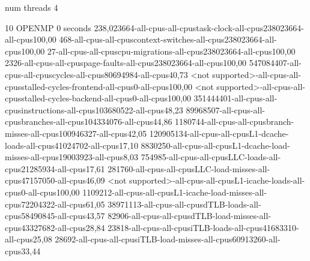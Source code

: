 num threads 4

10
OPENMP
0 seconds
238,023664-all-cpus-all-cpustask-clock-all-cpus238023664-all-cpus100,00
468-all-cpus-all-cpuscontext-switches-all-cpus238023664-all-cpus100,00
27-all-cpus-all-cpuscpu-migrations-all-cpus238023664-all-cpus100,00
2326-all-cpus-all-cpuspage-faults-all-cpus238023664-all-cpus100,00
547084407-all-cpus-all-cpuscycles-all-cpus80694984-all-cpus40,73
<not supported>-all-cpus-all-cpusstalled-cycles-frontend-all-cpus0-all-cpus100,00
<not supported>-all-cpus-all-cpusstalled-cycles-backend-all-cpus0-all-cpus100,00
351444401-all-cpus-all-cpusinstructions-all-cpus103680522-all-cpus48,23
89968507-all-cpus-all-cpusbranches-all-cpus104334076-all-cpus44,86
1180744-all-cpus-all-cpusbranch-misses-all-cpus100946327-all-cpus42,05
120905134-all-cpus-all-cpusL1-dcache-loads-all-cpus41024702-all-cpus17,10
8830250-all-cpus-all-cpusL1-dcache-load-misses-all-cpus19003923-all-cpus8,03
754985-all-cpus-all-cpusLLC-loads-all-cpus21285934-all-cpus17,61
281760-all-cpus-all-cpusLLC-load-misses-all-cpus47157050-all-cpus46,09
<not supported>-all-cpus-all-cpusL1-icache-loads-all-cpus0-all-cpus100,00
1109212-all-cpus-all-cpusL1-icache-load-misses-all-cpus72204322-all-cpus61,05
38971113-all-cpus-all-cpusdTLB-loads-all-cpus58490845-all-cpus43,57
82906-all-cpus-all-cpusdTLB-load-misses-all-cpus43327682-all-cpus28,84
23818-all-cpus-all-cpusiTLB-loads-all-cpus41683310-all-cpus25,08
28692-all-cpus-all-cpusiTLB-load-misses-all-cpus60913260-all-cpus33,44
